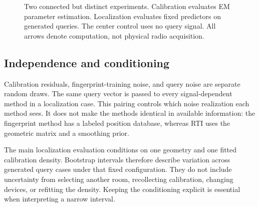 \documentclass[conference,letterpaper]{IEEEtran}
\begin{document}
\begin{figure}[t]
\centering
{}
\caption{Two connected but distinct experiments. Calibration evaluates EM parameter estimation. Localization evaluates fixed predictors on generated queries. The center control uses no query signal. All arrows denote computation, not physical radio acquisition.}
\label{fig:flow}
\end{figure}

\subsection{Independence and conditioning}
Calibration residuals, fingerprint-training noise, and query noise are separate random draws. The same query vector is passed to every signal-dependent method in a localization case. This pairing controls which noise realization each method sees. It does not make the methods identical in available information: the fingerprint method has a labeled position database, whereas RTI uses the geometric matrix and a smoothing prior.

The main localization evaluation conditions on one geometry and one fitted calibration density. Bootstrap intervals therefore describe variation across generated query cases under that fixed configuration. They do not include uncertainty from selecting another room, recollecting calibration, changing devices, or refitting the density. Keeping the conditioning explicit is essential when interpreting a narrow interval.
\end{document}
